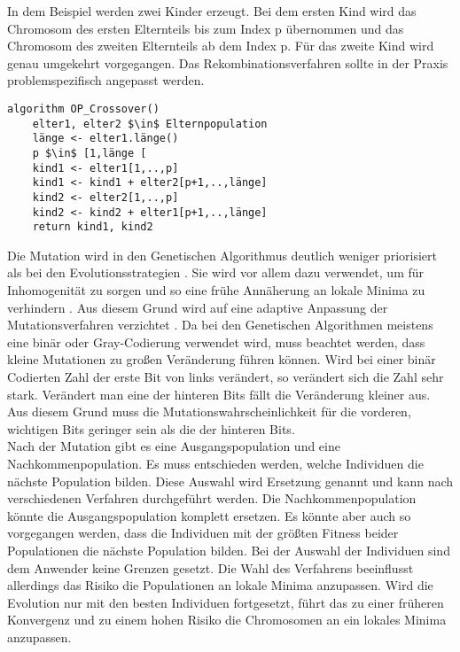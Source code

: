 In dem Beispiel werden zwei Kinder erzeugt. Bei dem ersten Kind wird das Chromosom des ersten Elternteils bis zum Index p übernommen und das Chromosom des zweiten Elternteils ab dem Index p. Für das zweite Kind wird genau umgekehrt vorgegangen. Das Rekombinationsverfahren sollte in der Praxis problemspezifisch angepasst werden.
\begin{lstlisting}[caption={One-Point-Crossover}, firstnumber=1, captionpos=b,label=lst:crossover]
algorithm OP_Crossover()
	elter1, elter2 $\in$ Elternpopulation
	länge <- elter1.länge()
	p $\in$ [1,länge [
	kind1 <- elter1[1,..,p]
	kind1 <- kind1 + elter2[p+1,..,länge]
	kind2 <- elter2[1,..,p]
	kind2 <- kind2 + elter1[p+1,..,länge]
	return kind1, kind2
\end{lstlisting}
Die Mutation wird in den Genetischen Algorithmus deutlich weniger priorisiert als bei den Evolutionsstrategien \cite[S. 200]{schoeneburg}. Sie wird vor allem dazu verwendet, um für Inhomogenität zu sorgen und so eine frühe Annäherung an lokale Minima zu verhindern \cite[S. 200]{schoeneburg}.
Aus diesem Grund wird auf eine adaptive Anpassung der Mutationsverfahren verzichtet \cite[S. 200]{schoeneburg}. Da bei den Genetischen Algorithmen meistens eine binär oder Gray-Codierung verwendet wird, muss beachtet werden, dass kleine Mutationen zu großen Veränderung führen können.
Wird bei einer binär Codierten Zahl der erste Bit von links verändert, so verändert sich die Zahl sehr stark. Verändert man eine der hinteren Bits fällt die Veränderung kleiner aus. Aus diesem Grund muss die Mutationswahrscheinlichkeit für die vorderen, wichtigen Bits geringer sein als die der hinteren Bits.\\
Nach der Mutation gibt es eine Ausgangspopulation und eine Nachkommenpopulation. Es muss entschieden werden, welche Individuen die nächste Population bilden. Diese Auswahl wird Ersetzung genannt und kann nach verschiedenen Verfahren durchgeführt werden.
Die Nachkommenpopulation könnte die Ausgangspopulation komplett ersetzen. Es könnte aber auch so vorgegangen werden, dass die Individuen mit der größten Fitness beider Populationen die nächste Population bilden. Bei der Auswahl der Individuen sind dem Anwender keine Grenzen gesetzt. Die Wahl des Verfahrens beeinflusst allerdings das Risiko die Populationen an lokale Minima anzupassen. Wird die Evolution nur mit den besten Individuen fortgesetzt, führt das zu einer früheren Konvergenz und zu einem hohen Risiko die Chromosomen an ein lokales Minima anzupassen. 

